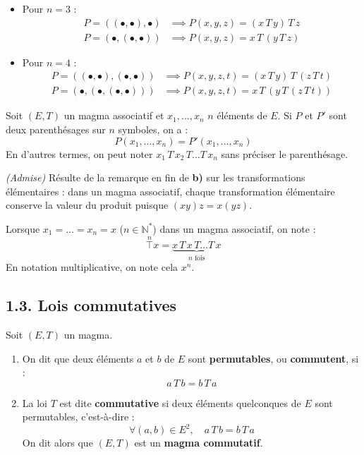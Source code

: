 \documentclass[a4paper,11pt]{article}
\newcommand{\N}{\mathbb{N}}
\newcommand{\mot}[1]{\textcolor{bordeaux}{\textbf{#1}}}
\begin{document}
\begin{exemples}
\begin{itemize}
    \item Pour $n = 3$ :
    \begin{align*}
        P = ((\bullet, \bullet), \bullet) &\implies P(x, y, z) = (x \, T \, y) \, T \, z \\
        P = (\bullet, (\bullet, \bullet)) &\implies P(x, y, z) = x \, T \, (y \, T \, z)
    \end{align*}
    \item Pour $n = 4$ :
    \begin{align*}
        P = ((\bullet, \bullet), (\bullet, \bullet)) &\implies P(x, y, z, t) = (x \, T \, y) \, T \, (z \, T \, t) \\
        P = (\bullet, (\bullet, (\bullet, \bullet))) &\implies P(x, y, z, t) = x \, T \, (y \, T \, (z \, T \, t))
    \end{align*}
\end{itemize}
\end{exemples}

\begin{proposition}
Soit $(E, T)$ un magma associatif et $x_1, \dots, x_n$ $n$ éléments de $E$. Si $P$ et $P'$ sont deux parenthésages sur $n$ symboles, on a :
\[
P(x_1, \dots, x_n) = P'(x_1, \dots, x_n)
\]
En d'autres termes, on peut noter $x_1 \, T \, x_2 \, T \dots T \, x_n$ sans préciser le parenthésage.
\end{proposition}

\begin{demonstration}
\textit{(Admise)} Résulte de la remarque en fin de \textbf{b)} sur les transformations élémentaires : dans un magma associatif, chaque transformation élémentaire conserve la valeur du produit puisque $(xy)z = x(yz)$.
\end{demonstration}

\begin{remarque}[Notation]
Lorsque $x_1 = \dots = x_n = x$ ($n \in \N^*$) dans un magma associatif, on note :
\[
\overset{n}{\underset{}{\top}} x = \underbrace{x \, T \, x \, T \dots T \, x}_{n \text{ fois}}
\]
En notation multiplicative, on note cela $x^n$.
\end{remarque}

\newpage
\subsection{1.3. Lois commutatives}

\begin{definition}
Soit $(E, T)$ un magma.
\begin{enumerate}
    \item On dit que deux éléments $a$ et $b$ de $E$ sont \mot{permutables}, ou \mot{commutent}, si :
    \[
    a \, T \, b = b \, T \, a
    \]
    \item La loi $T$ est dite \mot{commutative} si deux éléments quelconques de $E$ sont permutables, c'est-à-dire :
    \[
    \forall (a, b) \in E^2, \quad a \, T \, b = b \, T \, a
    \]
    On dit alors que $(E, T)$ est un \mot{magma commutatif}.
\end{enumerate}
\end{definition}
\end{document}
